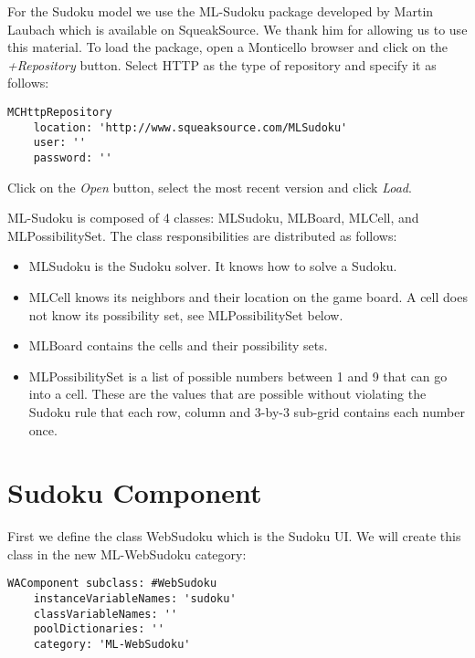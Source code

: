 \documentclass[a4paper,10pt,twoside]{book}
\newcommand{\ct}[1]{{\small\ttfamily\textup{#1}}}
\begin{document}
For the Sudoku model we use the ML-Sudoku package developed by Martin Laubach which is available on SqueakSource. We thank him for allowing us to use this material. To load the package, open a Monticello browser and click on the \textit{+Repository} button. Select HTTP as the type of repository and specify it as follows:

\begin{lstlisting}
MCHttpRepository
    location: 'http://www.squeaksource.com/MLSudoku'
    user: ''
    password: ''
\end{lstlisting}

Click on the \textit{Open} button, select the most recent version and click \textit{Load}.

ML-Sudoku is composed of 4 classes: \ct{MLSudoku}, \ct{MLBoard}, \ct{MLCell}, and \ct{MLPossibilitySet}. The class responsibilities are distributed as follows:

\begin{itemize}
\item  \ct{MLSudoku} is the Sudoku solver. It knows how to solve a Sudoku.
\item  \ct{MLCell} knows its neighbors and their location on the game board. A cell does not know its possibility set, see \ct{MLPossibilitySet} below.
\item  \ct{MLBoard} contains the cells and their possibility sets.
\item  \ct{ MLPossibilitySet} is a list of possible numbers between 1 and 9 that can go into a cell. These are the values that are possible without violating the Sudoku rule that each row, column and 3-by-3 sub-grid contains each number once.
\end{itemize}

\section{Sudoku Component}
\label{book:inaction:sudoku:seasidecomponent}

First we define the class \ct{WebSudoku} which is the Sudoku UI. We will create this class in the new \ct{ML-WebSudoku} category:

\begin{lstlisting}
WAComponent subclass: #WebSudoku
    instanceVariableNames: 'sudoku'
    classVariableNames: ''
    poolDictionaries: ''
    category: 'ML-WebSudoku'
\end{lstlisting}
\end{document}
